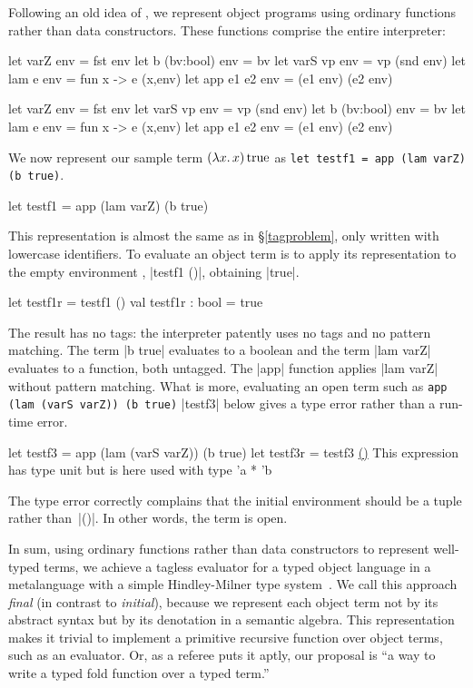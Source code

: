 Following an old idea of \citet{reynolds-user-defined},
we represent object programs using ordinary functions rather than
data constructors.  These functions comprise the entire interpreter:
\ifshort
\begin{code3}
let varZ env    = fst env         let b (bv:bool) env = bv
let varS vp env = vp (snd env)    let lam e env   = fun x -> e (x,env)
let app e1 e2 env   = (e1 env) (e2 env)
\end{code3}
\else
\begin{code}
let varZ env        = fst env
let varS vp env     = vp (snd env)
let b (bv:bool) env = bv
let lam e env       = fun x -> e (x,env)
let app e1 e2 env   = (e1 env) (e2 env)
\end{code}
\fi
We now represent our sample term $(\mathopen{\lambda\mathord{x}.\,}x)\mathinner{\mathrm{true}}$ as
\ifshort
\texttt{let testf1 = app (lam varZ) (b true)}.
\else
\begin{code}
let testf1 = app (lam varZ) (b true)
\end{code}
\fi
This representation is almost the same as in \S\ref{tagproblem}, only
written with lowercase identifiers. To evaluate an object term is to
apply its representation to the empty environment\ifshort
, |testf1 ()|, obtaining |true|\fi.
\ifshort\else
\begin{code}
let testf1r = testf1 ()
val testf1r : bool = true
\end{code}
\fi
The result has no tags: the interpreter patently uses no tags and no
pattern matching. The term |b true| evaluates to a boolean and the term
|lam varZ| evaluates to a function, both untagged. The |app| function
applies |lam varZ| without pattern matching. What is more, evaluating an
open term such as
\ifshort
\texttt{app (lam (varS varZ)) (b true)}
\else
|testf3| below
\fi
gives a type error rather than a run-time error.
\ifshort\else
\begin{code}[commandchars=\\\{\}]
let testf3 = app (lam (varS varZ)) (b true)
let testf3r = testf3 \underline{()}
This expression has type unit but is here used with type 'a * 'b
\end{code}
\fi
The type error correctly complains
that the initial environment should be a tuple rather than~|()|.
In other words, the term is open.

In sum, using ordinary functions rather than data constructors
to represent well-typed terms, we achieve a tagless evaluator
for a typed object language in a metalanguage with a simple 
\ifshort
Hindley-Milner \fi
type system\ifshort\else\ \citep{hindley-principal,milner-theory}\fi.
We call this approach \emph{final} (in contrast to \emph{initial}),
because we represent each object term not by its abstract syntax
but by its denotation in a semantic algebra.  This representation
makes it trivial to implement a primitive recursive function over
object terms, such as an evaluator.  Or, as a referee puts it aptly, our
proposal is ``a way to write a typed fold function over a typed term.''


